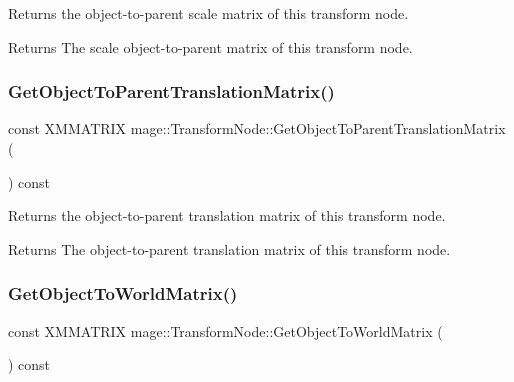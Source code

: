 Returns the object-\/to-\/parent scale matrix of this transform node.

\begin{DoxyReturn}{Returns}
The scale object-\/to-\/parent matrix of this transform node. 
\end{DoxyReturn}
\hypertarget{classmage_1_1_transform_node_ad548d659067b5aa6bb0d76c073850179}{}\label{classmage_1_1_transform_node_ad548d659067b5aa6bb0d76c073850179} 
\subsubsection{\texorpdfstring{Get\+Object\+To\+Parent\+Translation\+Matrix()}{GetObjectToParentTranslationMatrix()}}
{\footnotesize\ttfamily const X\+M\+M\+A\+T\+R\+IX mage\+::\+Transform\+Node\+::\+Get\+Object\+To\+Parent\+Translation\+Matrix (\begin{DoxyParamCaption}{ }\end{DoxyParamCaption}) const}

Returns the object-\/to-\/parent translation matrix of this transform node.

\begin{DoxyReturn}{Returns}
The object-\/to-\/parent translation matrix of this transform node. 
\end{DoxyReturn}
\hypertarget{classmage_1_1_transform_node_aa380b495bdf5ac30abe63c542175a60e}{}\label{classmage_1_1_transform_node_aa380b495bdf5ac30abe63c542175a60e} 
\subsubsection{\texorpdfstring{Get\+Object\+To\+World\+Matrix()}{GetObjectToWorldMatrix()}}
{\footnotesize\ttfamily const X\+M\+M\+A\+T\+R\+IX mage\+::\+Transform\+Node\+::\+Get\+Object\+To\+World\+Matrix (\begin{DoxyParamCaption}{ }\end{DoxyParamCaption}) const}

